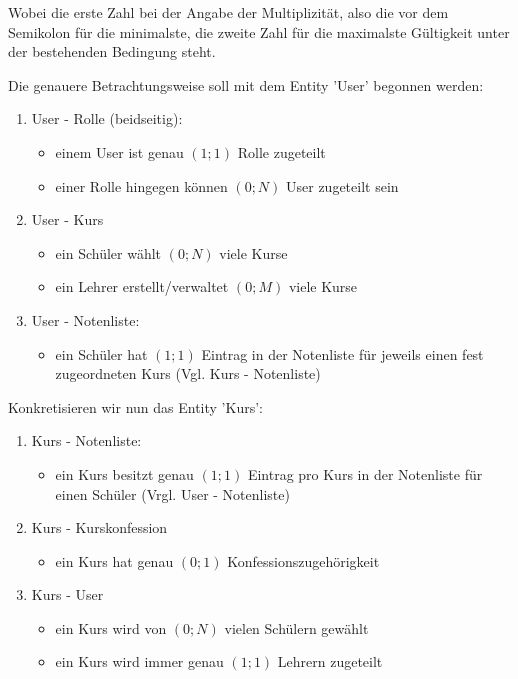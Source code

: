 Wobei die erste Zahl bei der Angabe der Multiplizität, also die vor dem Semikolon für die minimalste, die zweite Zahl für die maximalste Gültigkeit unter der bestehenden Bedingung steht.

Die genauere Betrachtungsweise soll mit dem Entity 'User' begonnen werden:

\begin{enumerate}
  \item User - Rolle (beidseitig):	
    \begin{itemize}
      \item einem User ist genau $(1;1)$ Rolle zugeteilt
      \item einer Rolle hingegen können $(0;N)$ User zugeteilt sein
    \end{itemize}

  \item User - Kurs
    \begin{itemize}
      \item ein Schüler wählt $(0;N)$ viele Kurse
      \item ein Lehrer erstellt/verwaltet $(0;M)$ viele Kurse
    \end{itemize}
  
  \item User - Notenliste:
    \begin{itemize}
      \item ein Schüler hat $(1;1)$ Eintrag in der Notenliste für jeweils einen fest zugeordneten Kurs (Vgl. Kurs - Notenliste)
    \end{itemize}

\end{enumerate}

Konkretisieren wir nun das Entity 'Kurs':

\begin{enumerate}
  \item Kurs - Notenliste:
  \begin{itemize}
    \item ein Kurs besitzt genau $(1;1)$ Eintrag pro Kurs in der Notenliste für einen Schüler (Vrgl. User - Notenliste)
  \end{itemize}
  
  \item Kurs - Kurskonfession	
    \begin{itemize}
      \item ein Kurs hat genau $(0;1)$ Konfessionszugehörigkeit
    \end{itemize}

  \item Kurs - User	
    \begin{itemize}
      \item ein Kurs wird von $(0;N)$ vielen Schülern gewählt
      \item ein Kurs wird immer genau $(1;1)$ Lehrern zugeteilt
    \end{itemize}
\end{enumerate}

